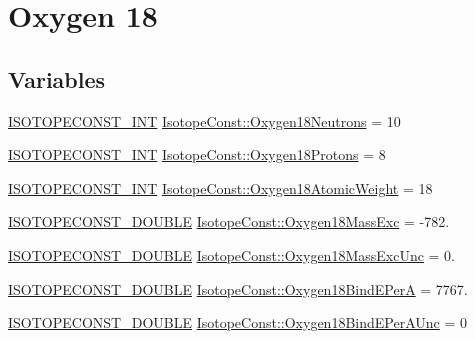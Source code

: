 \hypertarget{group___isotope_const-_oxygen-_o18}{}\section{Oxygen 18}
\label{group___isotope_const-_oxygen-_o18}
\subsection*{Variables}
\begin{DoxyCompactItemize}
\item 
\mbox{\hyperlink{group___isotope_const-_macros_ga5f18360b3e99483a35c32d789e62621c}{I\+S\+O\+T\+O\+P\+E\+C\+O\+N\+S\+T\+\_\+\+I\+NT}} \mbox{\hyperlink{group___isotope_const-_oxygen-_o18_ga5f56459140784c26832e6c1f4553162d}{Isotope\+Const\+::\+Oxygen18\+Neutrons}} = 10
\item 
\mbox{\hyperlink{group___isotope_const-_macros_ga5f18360b3e99483a35c32d789e62621c}{I\+S\+O\+T\+O\+P\+E\+C\+O\+N\+S\+T\+\_\+\+I\+NT}} \mbox{\hyperlink{group___isotope_const-_oxygen-_o18_ga5b8d51af12a133695ba36a3e5102113d}{Isotope\+Const\+::\+Oxygen18\+Protons}} = 8
\item 
\mbox{\hyperlink{group___isotope_const-_macros_ga5f18360b3e99483a35c32d789e62621c}{I\+S\+O\+T\+O\+P\+E\+C\+O\+N\+S\+T\+\_\+\+I\+NT}} \mbox{\hyperlink{group___isotope_const-_oxygen-_o18_ga057fda0883bde5c290c0efe43dbe0672}{Isotope\+Const\+::\+Oxygen18\+Atomic\+Weight}} = 18
\item 
\mbox{\hyperlink{group___isotope_const-_macros_ga8f45a7272ce02c0b4c65c44636ed719a}{I\+S\+O\+T\+O\+P\+E\+C\+O\+N\+S\+T\+\_\+\+D\+O\+U\+B\+LE}} \mbox{\hyperlink{group___isotope_const-_oxygen-_o18_ga7f496c6a37ef11f67c8bd3e7ba52a0a7}{Isotope\+Const\+::\+Oxygen18\+Mass\+Exc}} = -\/782.
\item 
\mbox{\hyperlink{group___isotope_const-_macros_ga8f45a7272ce02c0b4c65c44636ed719a}{I\+S\+O\+T\+O\+P\+E\+C\+O\+N\+S\+T\+\_\+\+D\+O\+U\+B\+LE}} \mbox{\hyperlink{group___isotope_const-_oxygen-_o18_ga150d8bcb18fd61685ca043c6c74a40b0}{Isotope\+Const\+::\+Oxygen18\+Mass\+Exc\+Unc}} = 0.
\item 
\mbox{\hyperlink{group___isotope_const-_macros_ga8f45a7272ce02c0b4c65c44636ed719a}{I\+S\+O\+T\+O\+P\+E\+C\+O\+N\+S\+T\+\_\+\+D\+O\+U\+B\+LE}} \mbox{\hyperlink{group___isotope_const-_oxygen-_o18_gaf880cd41b55890a21825463f1f519862}{Isotope\+Const\+::\+Oxygen18\+Bind\+E\+PerA}} = 7767.
\item 
\mbox{\hyperlink{group___isotope_const-_macros_ga8f45a7272ce02c0b4c65c44636ed719a}{I\+S\+O\+T\+O\+P\+E\+C\+O\+N\+S\+T\+\_\+\+D\+O\+U\+B\+LE}} \mbox{\hyperlink{group___isotope_const-_oxygen-_o18_ga3d63f496715fdd0027fe714b1703d6db}{Isotope\+Const\+::\+Oxygen18\+Bind\+E\+Per\+A\+Unc}} = 0

\end{DoxyCompactItemize}
